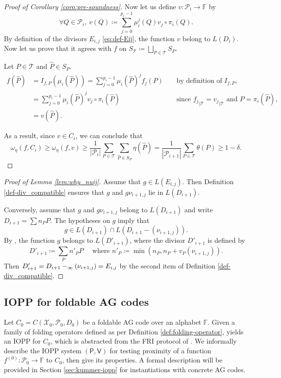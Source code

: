 \documentclass[a4paper,USenglish,autoref]{lipics-v2021}
\renewcommand\hat{\widehat}
\newcommand\F{\mathbb{F}}
\newcommand\poles[1]{\div_\infty\left( #1 \right)}
\renewcommand{\hat}{\widehat}
\let\div\relax\DeclareMathOperator{\div}{div}
\def\rest#1#2{{{#1}_{|#2}}}
\newcommand\prover{\mathsf{P}}
\newcommand\verifier{\mathsf{V}}
\newcommand{\size}[1]{\left|#1\right|}
\newcommand\calX{\mathcal{X}}
\newcommand\calP{\mathcal{P}}
\newcommand\calT{\mathcal{T}}
\newcommand\mydef{\coloneqq}
\begin{document}
\begin{proof}[Proof of Corollary \ref{coro:pre-soundness}]
	Now let us define $v : \calP_i \rightarrow \F$ by 
	\[\forall Q \in \calP_i, \: v(Q) \mydef \sum_{j=0}^{p_i-1} \mu_i^j(Q) v_j \circ \pi_i(Q).\]
	By definition of the divisors $E_{i,j}$ \eqref{eq:def-Eij}, the function $v$ belong to $L(D_i)$. Now let us prove that it agrees with $f$ on $S_{\calT} \mydef \bigsqcup_{P \in \calT} S_P$.
	
	Let $P \in \calT$ and $\hat{P} \in S_P$. 
	\begin{align*}
		f(\hat P) &= I_{f, P}(\mu_i(\hat P))= \sum_{j=0}^{p_i-1} \mu_i(\hat{P})^j f_j (P) & &\text{ by definition of } I_{f,P},& \\
		&= \sum_{j=0}^{p_i-1} \mu_i(\hat{P})^j v_j \circ \pi_i(\hat{P}) & &\text{ since } \rest{f_j}{\calT} = \rest{v_j}{\calT} \text{ and } P=\pi_i(\hat{P}),& \\
		& = v(\hat P).&& &
	\end{align*}
	
	As a result, since $v \in C_i$, we can conclude that
	\[\omega_\eta(f,C_i) \geq \omega_\eta(f,v) \geq \frac{1}{\size{\calP_i}} \sum_{P \in \calT} \sum_{\hat{P} \in S_P} \eta(\hat{P}) = \frac{1}{\size{\calP_{i+1}}}   \sum_{P \in \calT} \theta(P) \geq 1-\delta. \]
\end{proof}

\begin{proof}[Proof of Lemma \ref{lem:why_nuij}] Assume that $g \in L(E_{i,j})$. Then Definition \ref{def-div_compatible} ensures that $g$ and $g\nu_{i+1,j}$ lie in $L(D_{i+1})$.
	
	Conversely, assume that $g$ and $g\nu_{i+1,j}$ belong to  $L(D_{i+1})$ and write $D_{i+1} = \sum n_P P$. The hypotheses on $g$ imply that \[g \in L(D_{i+1}) \cap L(D_{i+1} - (\nu_{i+1,j})).\] By \cite[Lemma~2.6]{MP93}, the function $g$ belongs to $L(D'_{i+1})$, where the divisor $D'_{i+1}$ is defined by
	\[D'_{i+1} \mydef \sum_P n'_P P \quad \text{ where } n'_P \mydef \min(n_P,n_P+v_P(\nu_{i+1,j})).\]
	Then $D'_{i+1} = D_{i+1} - \poles{\nu_{i+1,j}} = E_{i,j}$ by the second item of Definition \ref{def-div_compatible}.
\end{proof}

\subsection{IOPP for foldable AG codes}\label{subsec:iopp-overview}

Let $C_0 = C(\calX_0, \calP_0, D_0)$ be a foldable AG code over an alphabet $\F$. 
Given a family of folding operators defined as per Definition \ref{def:folding-operator}, \cite{ABN21} yields an IOPP for $C_0$, which is abstracted from the \textsf{FRI} protocol of \cite{BBHR18a}. We informally describe the IOPP system $(\prover, \verifier)$ for testing proximity of a function $f^{(0)} : \calP_0 \rightarrow \F$ to $C_0$, then give its properties. A formal description will be provided in Section \ref{sec:kummer-iopp} for instantiations with concrete AG codes.
\end{document}
